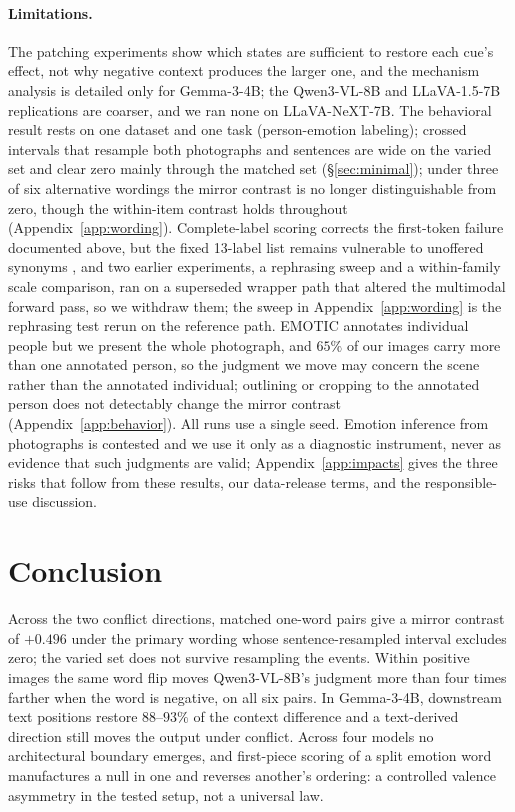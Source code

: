 \documentclass{article}
\newcommand{\gemma}{Gemma-3-4B}
\newcommand{\qwen}{Qwen3-VL-8B}
\newcommand{\llava}{LLaVA-1.5-7B}
\newcommand{\llavanext}{LLaVA-NeXT-7B}
\begin{document}
\paragraph{Limitations.}
\label{sec:limitations}
The patching experiments show which states are sufficient to restore each cue's effect, not why negative context produces the larger one, and the mechanism analysis is detailed only for \gemma{}; the \qwen{} and \llava{} replications are coarser, and we ran none on \llavanext{}. The behavioral result rests on one dataset and one task (person-emotion labeling); crossed intervals that resample both photographs and sentences are wide on the varied set and clear zero mainly through the matched set (\S\ref{sec:minimal}); under three of six alternative wordings the mirror contrast is no longer distinguishable from zero, though the within-item contrast holds throughout (Appendix~\ref{app:wording}). Complete-label scoring corrects the first-token failure documented above, but the fixed 13-label list remains vulnerable to unoffered synonyms \citep{holtzman2021}, and two earlier experiments, a rephrasing sweep and a within-family scale comparison, ran on a superseded wrapper path that altered the multimodal forward pass, so we withdraw them; the sweep in Appendix~\ref{app:wording} is the rephrasing test rerun on the reference path. EMOTIC annotates individual people but we present the whole photograph, and $65\%$ of our images carry more than one annotated person, so the judgment we move may concern the scene rather than the annotated individual; outlining or cropping to the annotated person does not detectably change the mirror contrast (Appendix~\ref{app:behavior}). All runs use a single seed. Emotion inference from photographs is contested and we use it only as a diagnostic instrument, never as evidence that such judgments are valid; Appendix~\ref{app:impacts} gives the three risks that follow from these results, our data-release terms, and the responsible-use discussion.

\section{Conclusion}
\label{sec:conclusion}

Across the two conflict directions, matched one-word pairs give a mirror contrast of $+0.496$ under the primary wording whose sentence-resampled interval excludes zero; the varied set does not survive resampling the events. Within positive images the same word flip moves \qwen{}'s judgment more than four times farther when the word is negative, on all six pairs. In \gemma{}, downstream text positions restore $88$--$93\%$ of the context difference and a text-derived direction still moves the output under conflict. Across four models no architectural boundary emerges, and first-piece scoring of a split emotion word manufactures a null in one and reverses another's ordering: a controlled valence asymmetry in the tested setup, not a universal law.
\fi
\end{document}
